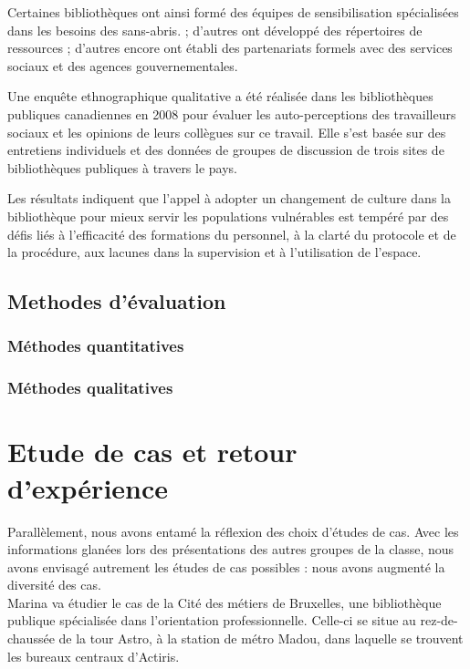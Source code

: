 \documentclass[french,a4paper,12pt]{article}
\begin{document}
Certaines bibliothèques ont ainsi formé des équipes de sensibilisation spécialisées dans les besoins des sans-abris. ; d'autres ont développé des répertoires de ressources ; d'autres encore ont établi des partenariats formels avec des services sociaux et des agences gouvernementales. 
 
Une enquête ethnographique qualitative a été réalisée dans les bibliothèques publiques canadiennes en 2008 pour évaluer les auto-perceptions des travailleurs sociaux et les opinions de leurs collègues sur ce travail. Elle s’est basée sur des entretiens individuels et des données de groupes de discussion de trois sites de bibliothèques publiques à travers le pays. 

Les résultats indiquent que l'appel à adopter un changement de culture dans la bibliothèque pour mieux servir les populations vulnérables est tempéré par des défis liés à l'efficacité des formations du personnel, à la clarté du protocole et de la procédure, aux lacunes dans la supervision et à l'utilisation de l'espace. 

 

 







\subsection{Methodes d'évaluation}

\subsubsection{Méthodes quantitatives}


\subsubsection{Méthodes qualitatives}

\newpage
\section{Etude de cas et retour d'expérience}
\quad Parallèlement, nous avons entamé la réflexion des choix d’études de cas. Avec les informations glanées lors des présentations des autres groupes de la classe, nous avons envisagé autrement les études de cas possibles : nous avons augmenté la diversité des cas.\\ 

Marina va étudier le cas de la Cité des métiers de Bruxelles, une bibliothèque publique spécialisée dans l’orientation professionnelle. Celle-ci se situe au rez-de-chaussée de la tour Astro, à la station de métro Madou, dans laquelle se trouvent les bureaux centraux d’Actiris.
\end{document}
